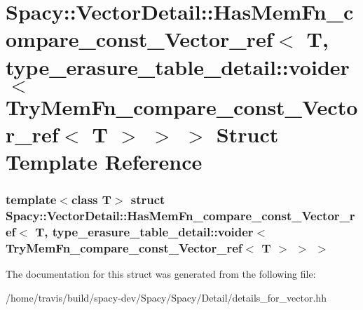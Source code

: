 \hypertarget{structSpacy_1_1VectorDetail_1_1HasMemFn__compare__const__Vector__ref_3_01T_00_01type__erasure__t44928eca7b016cce7b1e7a6939a15063}{\section{\-Spacy\-:\-:\-Vector\-Detail\-:\-:\-Has\-Mem\-Fn\-\_\-compare\-\_\-const\-\_\-\-Vector\-\_\-ref$<$ \-T, type\-\_\-erasure\-\_\-table\-\_\-detail\-:\-:voider$<$ \-Try\-Mem\-Fn\-\_\-compare\-\_\-const\-\_\-\-Vector\-\_\-ref$<$ \-T $>$ $>$ $>$ \-Struct \-Template \-Reference}
\label{structSpacy_1_1VectorDetail_1_1HasMemFn__compare__const__Vector__ref_3_01T_00_01type__erasure__t44928eca7b016cce7b1e7a6939a15063}
}
\subsubsection*{template$<$class T$>$ struct Spacy\-::\-Vector\-Detail\-::\-Has\-Mem\-Fn\-\_\-compare\-\_\-const\-\_\-\-Vector\-\_\-ref$<$ T, type\-\_\-erasure\-\_\-table\-\_\-detail\-::voider$<$ Try\-Mem\-Fn\-\_\-compare\-\_\-const\-\_\-\-Vector\-\_\-ref$<$ T $>$ $>$ $>$}



\-The documentation for this struct was generated from the following file\-:\begin{DoxyCompactItemize}
\item 
/home/travis/build/spacy-\/dev/\-Spacy/\-Spacy/\-Detail/details\-\_\-for\-\_\-vector.\-hh\end{DoxyCompactItemize}
